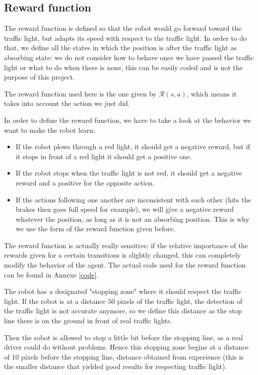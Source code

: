 \documentclass[14pt,a4paper]{article}
\theoremstyle{definition}
\begin{document}
\subsection{Reward function} \label{reward function}

The reward function is defined so that the robot would go forward toward the traffic light, but adapts its speed with respect to the traffic light. In order to do that, we define all the states in which the position is after the traffic light as absorbing state: we do not consider how to behave once we have passed the traffic light or what to do when there is none, this can be easily coded and is not the purpose of this project.

The reward function used here is the one given by $\mathcal{R}(s,a)$, which means it takes into account the action we just did.

In order to define the reward function, we have to take a look at the behavior we want to make the robot learn: 
\begin{itemize}
\item If the robot plows through a red light, it should get a negative reward, but if it stops in front of a red light it should get a positive one.
\item If the robot stops when the traffic light is not red, it should get a negative reward and a positive for the opposite action.
\item If the actions following one another are inconsistent with each other (hits the brakes then goes full speed for example), we will give a negative reward whatever the position, as long as it is not an absorbing position. This is why we use the form of the reward function given before.
\end{itemize}

The reward function is actually really sensitive: if the relative importance of the rewards given for a certain transitions is slightly changed, this can completely modify the behavior of the agent. The actual code used for the reward function can be found in Annexe \ref{code}.

The robot has a designated "stopping zone" where it should respect the traffic light. If the robot is at a distance $50$ pixels of the traffic light, the detection of the traffic light is not accurate anymore, so we define this distance as the stop line there is on the ground in front of real traffic lights.

Then the robot is allowed to stop a little bit before the stopping line, as a real driver could do without problems. Hence this stopping zone begins at a distance of 10 pixels before the stopping line, distance obtained from experience (this is the smaller distance that yielded good results for respecting traffic light).
\end{document}

